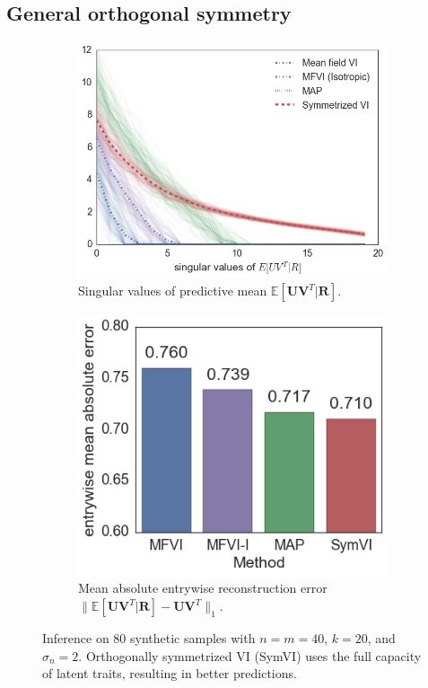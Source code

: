 \documentclass{article}
\newcommand{\E}{\mathbb{E}}
\renewcommand{\v}[1]{\mathbf{#1}}
\begin{document}

\subsection{General orthogonal symmetry}
\begin{figure}[t]
\centering
\begin{subfigure}[t]{.5\textwidth}
\includegraphics[width=\textwidth]{rot_sv_plot}
\caption{Singular values of predictive mean $\E[\v{U}\v{V}^T |
  \v{R}]$. }
\label{fig:rot_svs}
\end{subfigure}
\begin{subfigure}[t]{.45\textwidth}
\includegraphics[width=\textwidth]{rot_error_barplot}
\caption{Mean absolute entrywise reconstruction error $\|\E[\v{U}\v{V}^T | \v{R}] - \v{U}\v{V}^T
  \|_1$.}
\label{fig:rot_error}
\end{subfigure}
\caption{Inference on 80 synthetic samples with $n=m=40$, $k=20$, and $\sigma_n
  = 2$. Orthogonally symmetrized VI (SymVI) uses the full capacity of
  latent traits, resulting in better predictions.}
\end{figure}
\end{document}
